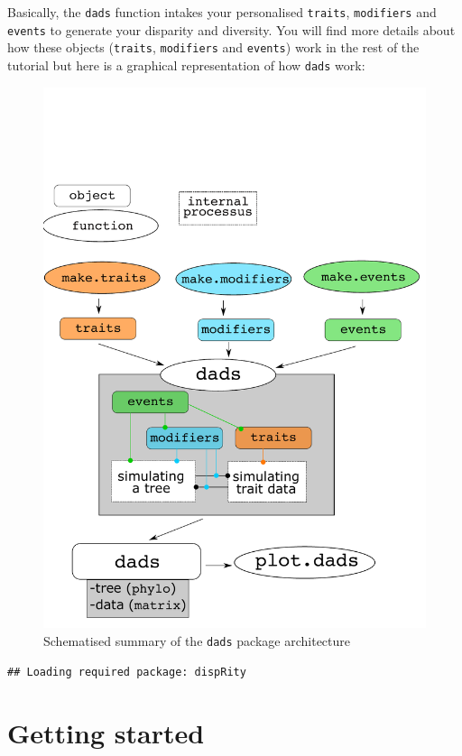 \documentclass[]{book}
\begin{document}
Basically, the \texttt{dads} function intakes your personalised \texttt{traits}, \texttt{modifiers} and \texttt{events} to generate your disparity and diversity.
You will find more details about how these objects (\texttt{traits}, \texttt{modifiers} and \texttt{events}) work in the rest of the tutorial but here is a graphical representation of how \texttt{dads} work:

\begin{figure}
\centering
\includegraphics{dads_structure.pdf}
\caption{Schematised summary of the \texttt{dads} package architecture}
\end{figure}

\begin{verbatim}
## Loading required package: dispRity
\end{verbatim}

\hypertarget{getting-started}{%
\chapter{Getting started}\label{getting-started}}
\end{document}
